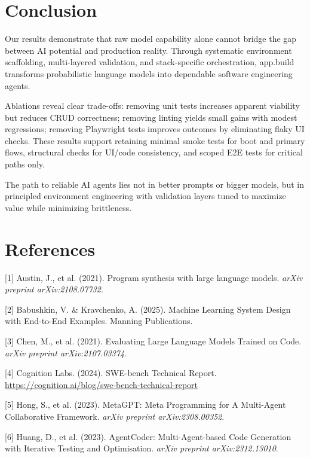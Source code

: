 \documentclass{article}
\begin{document}
\section{Conclusion}
\label{sec:conclusion}

Our results demonstrate that raw model capability alone cannot bridge the gap between AI potential and production reality. Through systematic environment scaffolding, multi-layered validation, and stack-specific orchestration, app.build transforms probabilistic language models into dependable software engineering agents.

Ablations reveal clear trade-offs: removing unit tests increases apparent viability but reduces CRUD correctness; removing linting yields small gains with modest regressions; removing Playwright tests improves outcomes by eliminating flaky UI checks. These results support retaining minimal smoke tests for boot and primary flows, structural checks for UI/code consistency, and scoped E2E tests for critical paths only.

The path to reliable AI agents lies not in better prompts or bigger models, but in principled environment engineering with validation layers tuned to maximize value while minimizing brittleness.


\section*{References}


\small

[1] Austin, J., et al. (2021). Program synthesis with large language models. \textit{arXiv preprint arXiv:2108.07732}.

[2] Babushkin, V. \& Kravchenko, A. (2025). Machine Learning System Design with End-to-End Examples. Manning Publications.

[3] Chen, M., et al. (2021). Evaluating Large Language Models Trained on Code. \textit{arXiv preprint arXiv:2107.03374}.

[4] Cognition Labs. (2024). SWE-bench Technical Report. \url{https://cognition.ai/blog/swe-bench-technical-report}

[5] Hong, S., et al. (2023). MetaGPT: Meta Programming for A Multi-Agent Collaborative Framework. \textit{arXiv preprint arXiv:2308.00352}.

[6] Huang, D., et al. (2023). AgentCoder: Multi-Agent-based Code Generation with Iterative Testing and Optimisation. \textit{arXiv preprint arXiv:2312.13010}.
\end{document}
